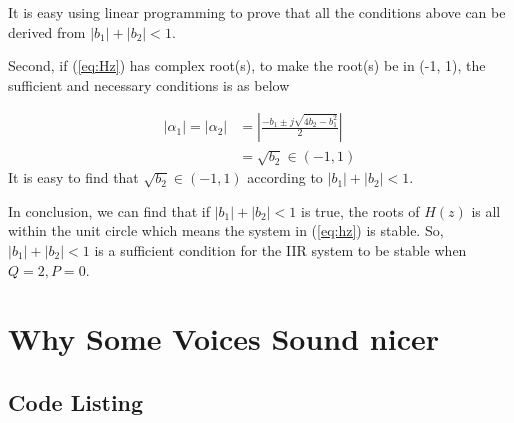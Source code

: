 \documentclass{article}
\begin{document}
It is easy using linear programming to prove that all the conditions above can be derived from $|b_1| + |b_2| < 1$.

Second, if (\ref{eq:Hz}) has complex root(s), to make the root(s) be in (-1, 1), the sufficient and necessary conditions is as below

\begin{align*}
		|\alpha_1| = |\alpha_2| &= |\frac{-b_1 \pm j\sqrt{4b_2 - b_1^2}}{2}| \\ 
		&= \sqrt{b_2} \in (-1, 1)
\end{align*}
It is easy to find that $\sqrt{b_2} \in (-1, 1)$ according to $|b_1| + |b_2| < 1$. 

In conclusion, we can find that if $|b_1| + |b_2| < 1$ is true, the roots of $H(z)$ is all within the unit circle which means the system in (\ref{eq:hz}) is stable. So, $|b_1| + |b_2| < 1$ is a sufficient condition for the IIR system to be stable when $Q = 2, P = 0$.

\section{Why Some Voices Sound nicer}







\begin{appendices}
\section{Code Listing}
\end{appendices}
\end{document}
